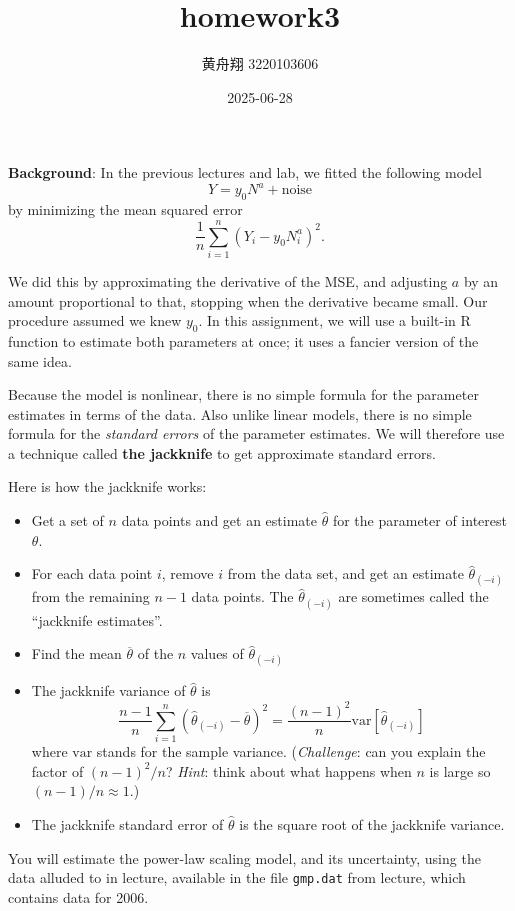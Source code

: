 \documentclass[
]{article}
\title{homework3}
\author{黄舟翔 3220103606}
\date{2025-06-28}
\providecommand{\tightlist}{%
  \setlength{\itemsep}{0pt}\setlength{\parskip}{0pt}}
\begin{document}
\maketitle

\textbf{Background}: In the previous lectures and lab, we fitted the
following model \[
 Y = y_0 N^a + \mathrm{noise}
\] by minimizing the mean squared error \[
 \frac{1}{n}\sum_{i=1}^{n}{(Y_i - y_0 N_i^a)^2}.
\]

We did this by approximating the derivative of the MSE, and adjusting
\(a\) by an amount proportional to that, stopping when the derivative
became small. Our procedure assumed we knew \(y_0\). In this assignment,
we will use a built-in R function to estimate both parameters at once;
it uses a fancier version of the same idea.

Because the model is nonlinear, there is no simple formula for the
parameter estimates in terms of the data. Also unlike linear models,
there is no simple formula for the \emph{standard errors} of the
parameter estimates. We will therefore use a technique called
\textbf{the jackknife} to get approximate standard errors.

Here is how the jackknife works:

\begin{itemize}
\tightlist
\item
  Get a set of \(n\) data points and get an estimate \(\hat{\theta}\)
  for the parameter of interest \(\theta\).
\item
  For each data point \(i\), remove \(i\) from the data set, and get an
  estimate \(\hat{\theta}_{(-i)}\) from the remaining \(n-1\) data
  points. The \(\hat{\theta}_{(-i)}\) are sometimes called the
  ``jackknife estimates''.
\item
  Find the mean \(\overline{\theta}\) of the \(n\) values of
  \(\hat{\theta}_{(-i)}\)
\item
  The jackknife variance of \(\hat{\theta}\) is \[
  \frac{n-1}{n}\sum_{i=1}^{n}{(\hat{\theta}_{(-i)} - \overline{\theta})^2} = \frac{(n-1)^2}{n}\mathrm{var}{[\hat{\theta}_{(-i)}]}
  \] where \(\mathrm{var}\) stands for the sample variance.
  (\emph{Challenge}: can you explain the factor of \((n-1)^2/n\)?
  \emph{Hint}: think about what happens when \(n\) is large so
  \((n-1)/n \approx 1\).)
\item
  The jackknife standard error of \(\hat{\theta}\) is the square root of
  the jackknife variance.
\end{itemize}

You will estimate the power-law scaling model, and its uncertainty,
using the data alluded to in lecture, available in the file
\texttt{gmp.dat} from lecture, which contains data for 2006.
\end{document}
